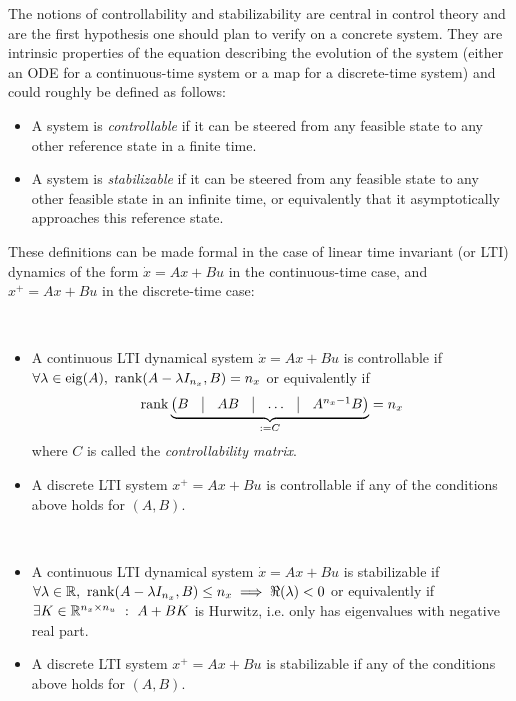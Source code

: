 \documentclass[12pt]{article}
\begin{document}
The notions of controllability and stabilizability are central in control theory and are the first hypothesis one should plan to verify on a concrete system.
They are intrinsic properties of the equation describing the evolution of the system (either an ODE for a continuous-time system or a map for a discrete-time system) and could roughly be defined as follows:
\begin{itemize}[label=\textbullet]
	\item A system is \textit{controllable} if it can be steered from any feasible state to any other reference state in a finite time.
	\item A system is \textit{stabilizable} if it can be steered from any feasible state to any other feasible state in an infinite time, or equivalently that it asymptotically approaches this reference state.
\end{itemize}

These definitions can be made formal in the case of linear time invariant (or LTI) dynamics of the form $\dot{x}=Ax+Bu$ in the continuous-time case, and $x^+=Ax+Bu$ in the discrete-time case:
\begin{definition}[Controllability]~
	\begin{itemize}[label=\textbullet]
		\item A continuous LTI dynamical system $\dot{x}=Ax+Bu$ is controllable if $\forall\lambda\in\mathrm{eig}(A),~\operatorname{rank}(A-\lambda I_{n_x},B)=n_x$ or equivalently if
		$$\rank\underbrace{\begin{pmatrix}B&\vline& AB&\vline&\ldots&\vline&A^{n_x-1}B\end{pmatrix}}_{:=C}=n_x$$
		where $C$ is called the \textit{controllability matrix}.

		\item A discrete LTI system $x^+=Ax+Bu$ is controllable if any of the conditions above holds for $(A,B)$.
	\end{itemize}
\end{definition}
\begin{definition}[Stabilizability]~
	\begin{itemize}[label=\textbullet]
		\item A continuous LTI dynamical system $\dot{x}=Ax+Bu$ is stabilizable if $\forall\lambda\in\mathbb{R},~\operatorname{rank}(A-\lambda I_{n_x},B)\leq n_x\implies \Re(\lambda)< 0$ or equivalently if $\exists K\in\mathbb{R}^{n_x\times n_u}~:~A+BK$ is Hurwitz, i.e. only has eigenvalues with negative real part.

		\item A discrete LTI system $x^+=Ax+Bu$ is stabilizable if any of the conditions above holds for $(A,B)$.
	\end{itemize}
\end{definition}
\end{document}
